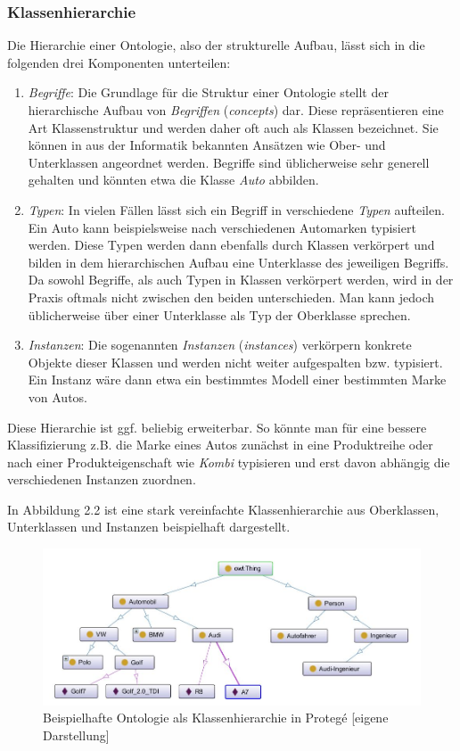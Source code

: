 \documentclass[12pt]{report}
\begin{document}
\subsubsection{Klassenhierarchie}
Die Hierarchie einer Ontologie, also der strukturelle Aufbau, lässt sich in die folgenden drei Komponenten unterteilen:
\begin{enumerate}
\item \textit{Begriffe}: Die Grundlage für die Struktur einer Ontologie stellt der hierarchische Aufbau von \textit{Begriffen} (\textit{concepts}) dar. Diese repräsentieren eine Art Klassenstruktur und werden daher oft auch als Klassen bezeichnet. Sie können in aus der Informatik bekannten Ansätzen wie Ober- und Unterklassen angeordnet werden. Begriffe sind üblicherweise sehr generell gehalten und könnten etwa die Klasse \textit{Auto} abbilden. 

\item \textit{Typen}: In vielen Fällen lässt sich ein Begriff in verschiedene \textit{Typen} aufteilen. Ein Auto kann beispielsweise nach verschiedenen Automarken typisiert werden. Diese Typen werden dann ebenfalls durch Klassen verkörpert und bilden in dem hierarchischen Aufbau eine Unterklasse des jeweiligen Begriffs. Da sowohl Begriffe, als auch Typen in Klassen verkörpert werden, wird in der Praxis oftmals nicht zwischen den beiden unterschieden. Man kann jedoch üblicherweise über einer Unterklasse als Typ der Oberklasse sprechen. 

\item \textit{Instanzen}: Die sogenannten \textit{Instanzen} (\textit{instances}) verkörpern konkrete Objekte dieser Klassen und werden nicht weiter aufgespalten bzw. typisiert. Ein Instanz wäre dann etwa ein bestimmtes Modell einer bestimmten Marke von Autos. 
\end{enumerate}

Diese Hierarchie ist ggf. beliebig erweiterbar. So könnte man für eine bessere Klassifizierung z.B. die Marke eines Autos zunächst in eine Produktreihe oder nach einer Produkteigenschaft wie \textit{Kombi} typisieren und erst davon abhängig die verschiedenen Instanzen zuordnen.

In Abbildung 2.2 ist eine stark vereinfachte Klassenhierarchie aus Oberklassen, Unterklassen und Instanzen beispielhaft dargestellt.

 
\begin{figure}[H]
\begin{center}
\includegraphics[scale=0.8]{Bilder/ontologyClasses.jpg}
\caption{Beispielhafte Ontologie als Klassenhierarchie  in Protegé [eigene Darstellung]}
\end{center}
\end{figure}
\end{document}
